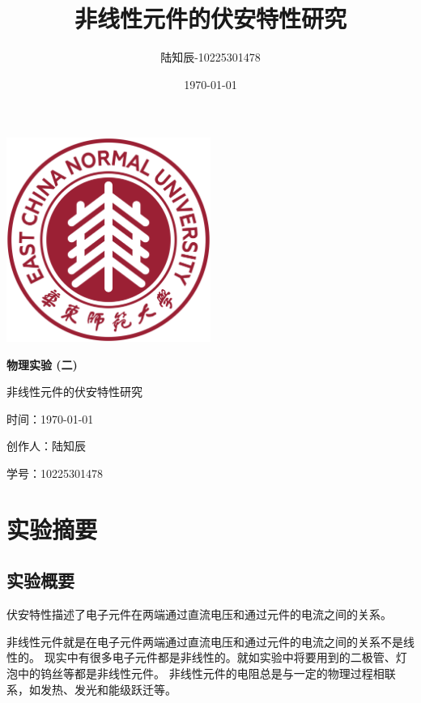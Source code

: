 \documentclass{ctexart}
\title{非线性元件的伏安特性研究}
\author{陆知辰-10225301478}
\date{\today}
\begin{document}
\begin{titlepage}
  \centering
  \includegraphics[width=0.5\textwidth]{ecnu.png}
  
  \vspace*{\baselineskip}
  
  \Huge\textbf{物\quad 理\quad 实\quad 验 \quad (二)}
  \vspace*{0.3\baselineskip}
  
  \huge 非线性元件的伏安特性研究
  
  \vspace*{2\baselineskip}
  
  \large 时间：\today
  
  \vspace*{\baselineskip}
  
  \large 创作人：陆知辰
  
  \vspace*{\baselineskip}
  
  \large 学号：10225301478
  
\end{titlepage}
\newpage
\tableofcontents
\newpage
\section{实验摘要}
  \subsection{实验概要}
  伏安特性描述了电子元件在两端通过直流电压和通过元件的电流之间的关系。

  非线性元件就是在电子元件两端通过直流电压和通过元件的电流之间的关系不是线性的。
  现实中有很多电子元件都是非线性的。就如实验中将要用到的二极管、灯泡中的钨丝等都是非线性元件。
  非线性元件的电阻总是与一定的物理过程相联系，如发热、发光和能级跃迁等。
\end{document}
